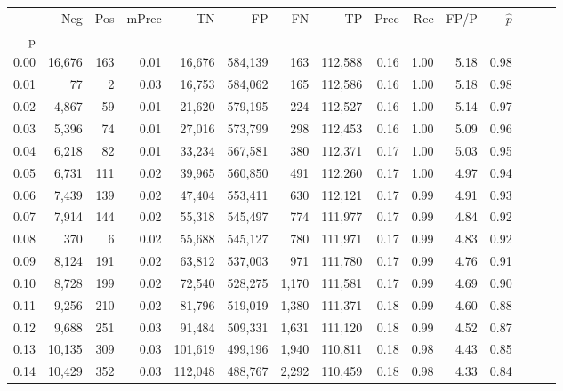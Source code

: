 \begin{tabular}{rrrrrrrrrrrrrrr}
\toprule
{} &     Neg &    Pos & mPrec &       TN &       FP &       FN &       TP &  Prec &   Rec &  FP/P & $\hat{p}$ \\
p    &         &        &       &          &          &          &          &       &       &       &           \\
\midrule
0.00 &  16,676 &    163 &  0.01 &   16,676 &  584,139 &      163 &  112,588 &  0.16 &  1.00 &  5.18 &      0.98 \\
0.01 &      77 &      2 &  0.03 &   16,753 &  584,062 &      165 &  112,586 &  0.16 &  1.00 &  5.18 &      0.98 \\
0.02 &   4,867 &     59 &  0.01 &   21,620 &  579,195 &      224 &  112,527 &  0.16 &  1.00 &  5.14 &      0.97 \\
0.03 &   5,396 &     74 &  0.01 &   27,016 &  573,799 &      298 &  112,453 &  0.16 &  1.00 &  5.09 &      0.96 \\
0.04 &   6,218 &     82 &  0.01 &   33,234 &  567,581 &      380 &  112,371 &  0.17 &  1.00 &  5.03 &      0.95 \\
0.05 &   6,731 &    111 &  0.02 &   39,965 &  560,850 &      491 &  112,260 &  0.17 &  1.00 &  4.97 &      0.94 \\
0.06 &   7,439 &    139 &  0.02 &   47,404 &  553,411 &      630 &  112,121 &  0.17 &  0.99 &  4.91 &      0.93 \\
0.07 &   7,914 &    144 &  0.02 &   55,318 &  545,497 &      774 &  111,977 &  0.17 &  0.99 &  4.84 &      0.92 \\
0.08 &     370 &      6 &  0.02 &   55,688 &  545,127 &      780 &  111,971 &  0.17 &  0.99 &  4.83 &      0.92 \\
0.09 &   8,124 &    191 &  0.02 &   63,812 &  537,003 &      971 &  111,780 &  0.17 &  0.99 &  4.76 &      0.91 \\
0.10 &   8,728 &    199 &  0.02 &   72,540 &  528,275 &    1,170 &  111,581 &  0.17 &  0.99 &  4.69 &      0.90 \\
0.11 &   9,256 &    210 &  0.02 &   81,796 &  519,019 &    1,380 &  111,371 &  0.18 &  0.99 &  4.60 &      0.88 \\
0.12 &   9,688 &    251 &  0.03 &   91,484 &  509,331 &    1,631 &  111,120 &  0.18 &  0.99 &  4.52 &      0.87 \\
0.13 &  10,135 &    309 &  0.03 &  101,619 &  499,196 &    1,940 &  110,811 &  0.18 &  0.98 &  4.43 &      0.85 \\
0.14 &  10,429 &    352 &  0.03 &  112,048 &  488,767 &    2,292 &  110,459 &  0.18 &  0.98 &  4.33 &      0.84 \\

\end{tabular}
